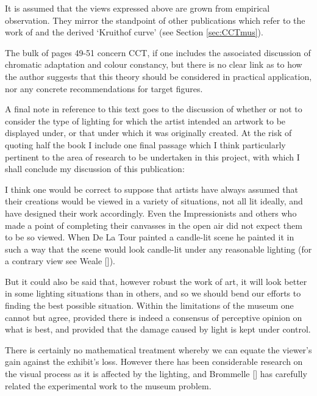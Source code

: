 It is assumed that the views expressed above are grown from empirical observation. They mirror the standpoint of other publications which refer to the work of \citet{kruithof_tubular_1941} and the derived `Kruithof curve' (see Section \ref{sec:CCTmus}).

The bulk of pages 49-51 concern \gls{CCT}, if one includes the associated discussion of chromatic adaptation and colour constancy, but there is no clear link as to how the author suggests that this theory should be considered in practical application, nor any concrete recommendations for target figures.

A final note in reference to this text goes to the discussion of whether or not to consider the type of lighting for which the artist intended an artwork to be displayed under, or that under which it was originally created. At the risk of quoting half the book I include one final passage which I think particularly pertinent to the area of research to be undertaken in this project, with which I shall conclude my discussion of this publication:

\begin{itquote}{}
I think one would be correct to suppose that artists have always assumed that their creations would be viewed in a variety of situations, not all lit ideally, and have designed their work accordingly. Even the Impressionists and others who made a point of completing their canvasses in the open air did not expect them to be so viewed. When De La Tour painted a candle-lit scene he painted it in such a way that the scene would look candle-lit under any reasonable lighting (for a contrary view see Weale [\citep{weale_truth_1973}]). 

But it could also be said that, however robust the work of art, it will look better in some lighting situations than in others, and so we should bend our efforts to finding the best possible situation. Within the limitations of the museum one cannot but agree, provided there is indeed a consensus of perceptive opinion on what is best, and provided that the damage caused by light is kept under control. 

There is certainly no mathematical treatment whereby we can equate the viewer's gain against the exhibit's loss. However there has been considerable research on the visual process as it is affected by the lighting, and Brommelle [\citep{brommelle_visual_1972}] has carefully related the experimental work to the museum problem.
\end{itquote}

